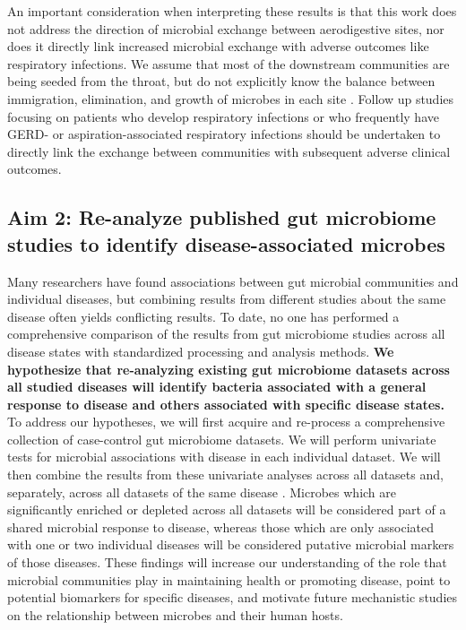 \documentclass[12pt]{article}
\begin{document}
An important consideration when interpreting these results is that
this work does not address the direction of microbial exchange between 
aerodigestive sites, nor does it directly link increased microbial 
exchange with adverse outcomes like respiratory infections.
We assume that most of the downstream communities are being seeded from the throat, 
but do not explicitly know the balance between immigration, elimination, and 
growth of microbes in each site \cite{bassis-source-2015}.
Follow up studies focusing on patients who develop respiratory 
infections or who frequently have GERD- or aspiration-associated 
respiratory infections should be undertaken to directly link the exchange
between communities with subsequent adverse clinical outcomes. 

\subsection{Aim 2: Re-analyze published gut	microbiome studies to identify disease-associated microbes}\label{sec:aim2}
Many researchers have found associations between gut microbial 
communities and individual diseases, but combining results from 
different studies about the same disease often yields conflicting results. To date, no one has
performed a comprehensive comparison of the results from gut microbiome 
studies across all disease states with standardized processing
and analysis methods.
\textbf{We hypothesize that re-analyzing existing gut microbiome datasets 
across all studied diseases will identify bacteria
associated with a general response to disease
and others associated with specific disease states.}
To address our hypotheses, we will first acquire and re-process a comprehensive
collection of case-control gut microbiome datasets. 
We will perform univariate tests for 
microbial associations with disease in each individual dataset. 
We will then combine the results from these univariate analyses across all datasets and,
separately, across all datasets of the same disease \cite{zavkin-ztest-2011}.
Microbes which are significantly enriched or depleted across 
all datasets will be considered part of a shared microbial response to
disease, whereas those which are only associated with one or two
individual diseases will be considered putative microbial markers of those diseases.
These findings will increase our understanding of
the role that microbial communities play in maintaining health or promoting disease,
point to potential biomarkers for specific diseases,
and motivate future mechanistic studies on the relationship between microbes and their human hosts.
\end{document}
